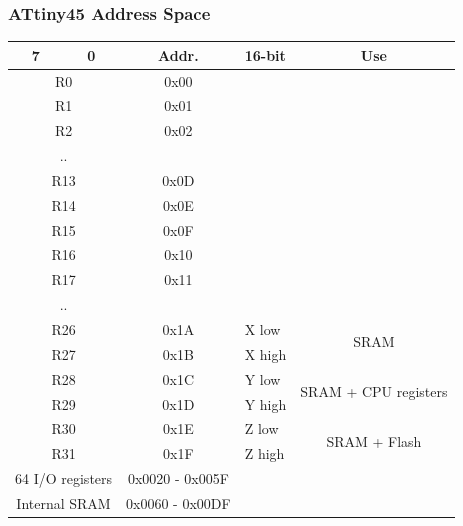 \documentclass{beamer}
\begin{document}
\begin{frame}[fragile]
\frametitle{ATtiny45 Address Space}
\begin{footnotesize}
\begin{tabular}{c c c l c}
7 & 0 & Addr. & 16-bit & Use \\
\hline
\multicolumn{2}{c}{R0} & 0x00 & \\
\multicolumn{2}{c}{R1} & 0x01 & \\
\multicolumn{2}{c}{R2} & 0x02 & \\
\multicolumn{2}{c}{..} & & \\
\multicolumn{2}{c}{R13} & 0x0D & \\
\multicolumn{2}{c}{R14} & 0x0E & \\
\multicolumn{2}{c}{R15} & 0x0F & \\
\hline
\multicolumn{2}{c}{R16} & 0x10 & \\
\multicolumn{2}{c}{R17} & 0x11 & \\
\multicolumn{2}{c}{..} & & \\
\multicolumn{2}{c}{R26} & 0x1A & X low & \multirow{2}{*}{SRAM} \\
\multicolumn{2}{c}{R27} & 0x1B & X high & \\
\hline
\multicolumn{2}{c}{R28} & 0x1C & Y low & \multirow{2}{*}{SRAM + CPU registers} \\
\multicolumn{2}{c}{R29} & 0x1D & Y high \\
\hline
\multicolumn{2}{c}{R30} & 0x1E & Z low & \multirow{2}{*}{SRAM + Flash} \\
\multicolumn{2}{c}{R31} & 0x1F & Z high \\
\hline
\multicolumn{2}{c}{64 I/O registers} & 0x0020 - 0x005F & \\
\hline
\multicolumn{2}{c}{Internal SRAM} & 0x0060 - 0x00DF & \\
\end{tabular}
\end{footnotesize}
\end{frame}
\end{document}
